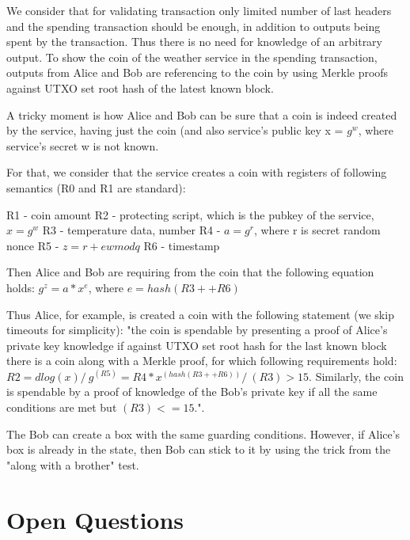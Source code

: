 \documentclass[11pt]{article}
\begin{document}
{We consider that for validating transaction only limited number of last headers and the spending transaction should be enough, in addition to outputs being spent by the transaction. Thus there is no need for knowledge of an arbitrary output. To show the coin of the weather service in the spending transaction, outputs from Alice and Bob are referencing to the coin by using Merkle proofs against UTXO set root hash of the latest known block.

A tricky moment is how Alice and Bob can be sure that a coin is indeed created by the service, having just the coin (and also service's public key x = $g^w$, where service's secret w is not known.

For that, we consider that the service creates a coin with registers of following semantics (R0 and R1 are standard):

R1 - coin amount
R2 - protecting script, which is the pubkey of the service, $x = g^w$
R3 - temperature data, number
R4 - $a = g^r$, where r is secret random nonce
R5 - $z = r + ew mod q$
R6 - timestamp

Then Alice and Bob are requiring from the coin that the following equation holds: $g^z = a * x^e$, where $e = hash(R3 ++ R6)$

Thus Alice, for example, is created a coin with the following statement (we skip timeouts for simplicity):
"the coin is spendable by presenting a proof of Alice's private key knowledge if against UTXO set root hash for
the last known block there is a coin along with a Merkle proof, for which following requirements hold:
$R2 = dlog(x) /\ g^(R5) = R4 * x^(hash(R3 ++ R6)) /\ (R3) > 15$. Similarly, the coin is spendable by a proof of
knowledge of the Bob's private key if all the same conditions are met but $(R3) <= 15$.".

The Bob can create a box with the same guarding conditions. However, if Alice's box is already in the state, then Bob can stick to it by using the trick from the "along with a brother" test.

\section{Open Questions}

}
\end{document}
